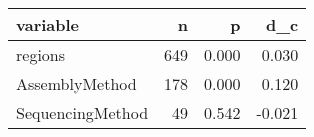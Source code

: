 \begin{table}[ht]
\centering
\begin{tabular}{lrrr}
  \hline
variable & n & p & d\_c \\ 
  \hline
regions &  649 & 0.000 & 0.030 \\ 
  AssemblyMethod &  178 & 0.000 & 0.120 \\ 
  SequencingMethod &   49 & 0.542 & -0.021 \\ 
   \hline
\end{tabular}
\end{table}
